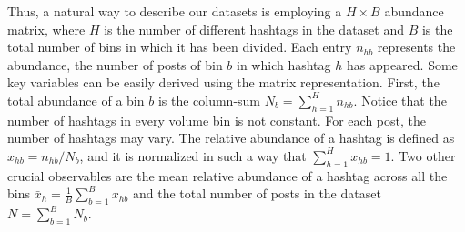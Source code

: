 

Thus, a natural way to describe our datasets is employing a $H \times B$ abundance matrix,  where $H$ is the number of different hashtags in the dataset and $B$ is the total number of bins in which it has been divided. Each entry $n_{hb}$ represents the abundance, the number of posts of bin $b$ in which hashtag $h$ has appeared. Some key variables can be easily derived using the matrix representation. First, the total abundance of a bin $b$ is the column-sum $N_b = \sum_{h = 1}^H n_{hb}$. Notice that the number of hashtags in every volume bin is not constant. For each post, the number of hashtags may vary. The relative abundance of a hashtag is defined as  $x_{hb} = n_{hb}/N_b$, and it is normalized in such a way that $\sum_{h = 1}^H x_{hb} = 1$. Two other crucial observables are the mean relative abundance of a hashtag across all the bins $\bar{x}_h = \frac{1}{B} \sum_{b=1}^B x_{hb}$ and the total number of posts in the dataset $N = \sum_{b=1}^B N_{b} $.\\

